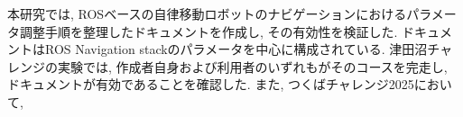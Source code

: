 本研究では, ROSベースの自律移動ロボットのナビゲーションにおけるパラメータ調整手順を整理したドキュメントを作成し, その有効性を検証した. 
ドキュメントはROS Navigation stackのパラメータを中心に構成されている. 
津田沼チャレンジの実験では, 作成者自身および利用者のいずれもがそのコースを完走し, ドキュメントが有効であることを確認した. 
また, つくばチャレンジ2025において, 